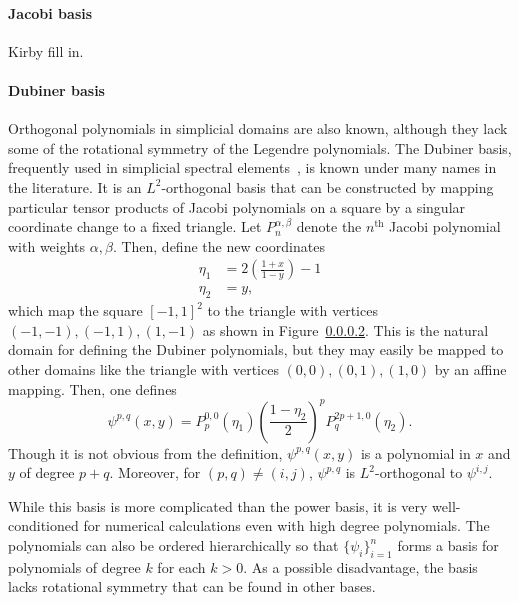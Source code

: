 \paragraph{Jacobi basis}
Kirby fill in. 

\paragraph{Dubiner basis}

Orthogonal polynomials in simplicial domains are also known, although
they lack some of the rotational symmetry of the Legendre polynomials.
The Dubiner basis, frequently used in simplicial spectral
elements~\cite{missing}, is known under many names in the literature.  It is
an \( L^2 \)-orthogonal basis that can be constructed by mapping particular
tensor products of Jacobi polynomials on a square by a singular
coordinate change to a fixed triangle.
Let \( P^{\alpha,\beta}_n \) denote the \( n^\mathrm{th} \) Jacobi
polynomial with weights \( \alpha, \beta \).  Then, define the
new coordinates
\begin{equation}
\label{eq:dubcoord}
\begin{split}
\eta_1 & = 2\left(\frac{1+x}{1-y}\right)-1 \\
\eta_2 & = y,
\end{split}
\end{equation}
which map the square \( [-1,1]^2 \) to the triangle with
vertices \( (-1,-1),(-1,1),(1,-1) \) as shown in Figure~\ref{}.  This
is the natural domain for defining the Dubiner polynomials, but they
may easily be mapped to other domains like the triangle with
vertices
\( (0,0) , (0,1) , (1,0) \) by an affine mapping.
Then, one defines
\begin{equation}
\psi^{p,q}(x,y) = P_p^{0,0}(\eta_1) \left( \frac{1-\eta_2}{2}
\right)^p P_q^{2p+1,0}(\eta_2).
\end{equation}
Though it is not obvious from the definition, \( \psi^{p,q}(x,y) \) is
a polynomial in \( x \) and \( y \) of degree \( p + q \).  Moreover,
for \( (p,q) \neq (i,j) \), \( \psi^{p,q} \) is \( L^2 \)-orthogonal to \(
\psi^{i,j} \).

While this basis is more complicated than the power basis, it is very
well-conditioned for numerical calculations even with high degree
polynomials.  The polynomials can also be ordered hierarchically so
that
\( \{ \psi_i \}_{i=1}^{n} \) forms a basis for  polynomials of
degree \( k \) for each \( k > 0 \).  As a possible disadvantage, the
basis lacks rotational symmetry that can be found in  other bases.

